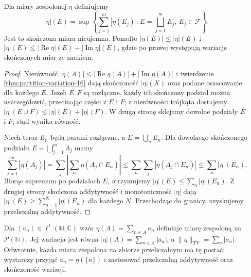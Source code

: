 \begin{twierdzenie}
\label{thm:complex-variation-16}
Dla miary zespolonej $\eta$ definiujemy
\[
|\eta|(E)=\sup\left\{\sum_{j=1}^m|\eta(E_j)|:
E=\bigsqcup_{j=1}^mE_j,\ E_j\in\mathcal F\right\}.
\]
Jest to skończona miara nieujemna. Ponadto
$|\eta(E)|\le|\eta|(E)$ i
$|\eta|(E)\le|\operatorname{Re}\eta|(E)+
|\operatorname{Im}\eta|(E)$, gdzie po prawej występują
wariacje skończonych miar ze znakiem.
\end{twierdzenie}
\begin{proof}
Nierówność $|\eta(A)|\le|\operatorname{Re}\eta(A)|+
|\operatorname{Im}\eta(A)|$ i twierdzenie
\ref{thm:partition-variation-16} dają skończoność
$|\eta|(X)$ oraz podane oszacowanie dla każdego $E$.
Jeżeli $E,F$ są rozłączne, każdy ich skończony podział
można uszczegółowić, przecinając części z $E$ i $F$;
z nierówności trójkąta dostajemy
$|\eta|(E\cup F)\le|\eta|(E)+|\eta|(F)$.
W drugą stronę sklejamy dowolne podziały $E$ i $F$;
stąd wynika równość.

Niech teraz $E_n$ będą parami rozłączne, a
$E=\bigcup_nE_n$. Dla dowolnego skończonego
podziału $E=\bigsqcup_{j=1}^m A_j$ mamy
\[
\sum_{j=1}^m|\eta(A_j)|
=\sum_j\left|\sum_n\eta(A_j\cap E_n)\right|
\le\sum_n\sum_j|\eta(A_j\cap E_n)|
\le\sum_n|\eta|(E_n).
\]
Biorąc supremum po podziałach $E$, otrzymujemy
$|\eta|(E)\le\sum_n|\eta|(E_n)$. Z drugiej strony
skończona addytywność i monotoniczność $|\eta|$
dają $|\eta|(E)\ge\sum_{n=1}^N|\eta|(E_n)$
dla każdego $N$. Przechodząc do granicy, uzyskujemy
przeliczalną addytywność.
\end{proof}

\begin{przyklad}
Dla $(a_n)\in\ell^1(\mathbb N;\mathbb C)$ wzór
$\eta(A)=\sum_{n\in A}a_n$ definiuje miarę zespoloną
na $\mathcal P(\mathbb N)$. Jej wariacja jest równa
$|\eta|(A)=\sum_{n\in A}|a_n|$, a
$\|\eta\|_{\mathrm{TV}}=\sum_n|a_n|$.
Odwrotnie, każda miara zespolona na zbiorze
przeliczalnym ma tę postać: wystarczy przyjąć
$a_n=\eta(\{n\})$ i zastosować przeliczalną
addytywność oraz skończoność wariacji.
\end{przyklad}

